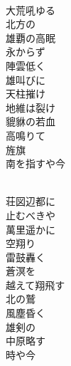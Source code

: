 \documentclass[10pt,b5j]{tarticle} %
\begin{document}
\vspace{1.5em} %
\newcommand{\linespace}{0.5em} %
\newcommand{\blocksize}{0.5\hsize} %
\newcommand{\itemmargin}{3em} %
\begin{enumerate} %
    \setlength{\itemindent}{\itemmargin} %
    \begin{minipage}[c]{\blocksize}
    
        \vspace{\linespace}
        \item~\\
        大荒吼ゆる\\
        北方の\\
        雄覇の高眠\\
        永からず\\
        陣雲低く\\
        雄叫びに\\
        天柱摧け\\
        地維は裂け\\
        貔貅の若血\\
        高鳴りて\\
        旌旗\\
        南を指すや今
        
    \end{minipage}
    \begin{minipage}[c]{\blocksize}
        
        \vspace{\linespace}
        \item~\\
        荘図辺都に\\
        止むべきや\\
        萬里遥かに\\
        空翔り\\
        雷鼓轟く\\
        蒼溟を\\
        越えて翔飛す\\
        北の鷲\\
        風塵昏く\\
        雄剣の\\
        中原略す\\
        時や今
        
    \end{minipage}
    \begin{minipage}[c]{\blocksize}
        

\end{minipage}
\end{enumerate}
\end{document}

